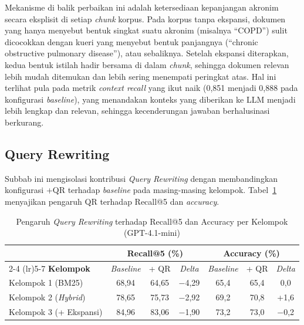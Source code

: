 Mekanisme di balik perbaikan ini adalah ketersediaan kepanjangan akronim secara eksplisit di setiap \textit{chunk} korpus. Pada korpus tanpa ekspansi, dokumen yang hanya menyebut bentuk singkat suatu akronim (misalnya ``COPD'') sulit dicocokkan dengan kueri yang menyebut bentuk panjangnya (``chronic obstructive pulmonary disease''), atau sebaliknya. Setelah ekspansi diterapkan, kedua bentuk istilah hadir bersama di dalam \textit{chunk}, sehingga dokumen relevan lebih mudah ditemukan dan lebih sering menempati peringkat atas. Hal ini terlihat pula pada metrik \textit{context recall} yang ikut naik (0{,}851 menjadi 0{,}888 pada konfigurasi \textit{baseline}), yang menandakan konteks yang diberikan ke LLM menjadi lebih lengkap dan relevan, sehingga kecenderungan jawaban berhalusinasi berkurang.

\subsection{Query Rewriting}
\label{subsec:efek-qr}

Subbab ini mengisolasi kontribusi \textit{Query Rewriting} dengan membandingkan konfigurasi +QR terhadap \textit{baseline} pada masing-masing kelompok. Tabel~\ref{tbl:efek-qr} menyajikan pengaruh QR terhadap Recall@5 dan \textit{accuracy}.

\begin{table}[H]
\centering
\small
\setlength{\tabcolsep}{6pt}
\caption{Pengaruh \textit{Query Rewriting} terhadap Recall@5 dan Accuracy per Kelompok (GPT-4.1-mini)}
\label{tbl:efek-qr}
\begin{tabular}{lcccccc}
\toprule
& \multicolumn{3}{c}{\textbf{Recall@5 (\%)}} & \multicolumn{3}{c}{\textbf{Accuracy (\%)}} \\
\cmidrule(lr){2-4} \cmidrule(lr){5-7}
\textbf{Kelompok} & \textit{Baseline} & + QR & \textit{Delta} & \textit{Baseline} & + QR & \textit{Delta} \\
\midrule
Kelompok 1 (BM25)             & 68{,}94 & 64{,}65 & $-$4{,}29 & 65{,}4 & 65{,}4 & 0{,}0 \\
Kelompok 2 (\textit{Hybrid})  & 78{,}65 & 75{,}73 & $-$2{,}92 & 69{,}2 & 70{,}8 & +1{,}6 \\
Kelompok 3 (+ Ekspansi)       & 84{,}96 & 83{,}06 & $-$1{,}90 & 73{,}2 & 73{,}0 & $-$0{,}2 \\
\bottomrule
\end{tabular}
\end{table}

